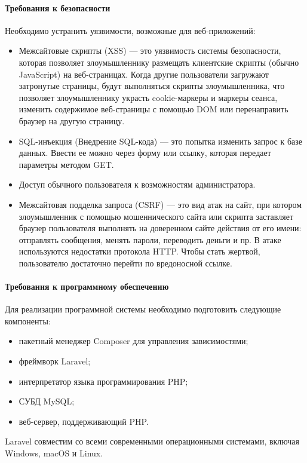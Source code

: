 \paragraph{Требования к безопасности}
Необходимо устранить уязвимости, возможные для веб-приложений:
\begin{itemize}
	\item Межсайтовые скрипты (XSS) — это уязвимость системы безопасности, которая позволяет злоумышленнику размещать клиентские скрипты (обычно JavaScript) на веб-страницах. Когда другие пользователи загружают затронутые страницы, будут выполняться скрипты злоумышленника, что позволяет злоумышленнику украсть cookie-маркеры и маркеры сеанса, изменить содержимое веб-страницы с помощью DOM или перенаправить браузер на другую страницу.
	\item SQL-инъекция (Внедрение SQL-кода) — это попытка изменить запрос к базе данных. Ввести ее можно через форму или ссылку, которая передает параметры методом GET\cite{dronov}.
	\item Доступ обычного пользователя к возможностям администратора.
	\item Межсайтовая подделка запроса (CSRF) — это вид атак на сайт, при котором злоумышленник с помощью мошеннического сайта или скрипта заставляет браузер пользователя выполнять на доверенном сайте действия от его имени: отправлять сообщения, менять пароли, переводить деньги и пр. В атаке используются недостатки протокола HTTP. Чтобы стать жертвой, пользователю достаточно перейти по вредоносной ссылке.
\end{itemize}

\paragraph{Требования к программному обеспечению}
Для реализации программной системы необходимо подготовить следующие компоненты:
\begin{itemize}
	\item пакетный менеджер Composer для управления зависимостями;
	\item фреймворк Laravel;
	\item интерпретатор языка программирования PHP;
	\item СУБД MySQL;
	\item веб-сервер, поддерживающий PHP.
\end{itemize}

Laravel совместим со всеми современными операционными системами, включая Windows, macOS и Linux.

